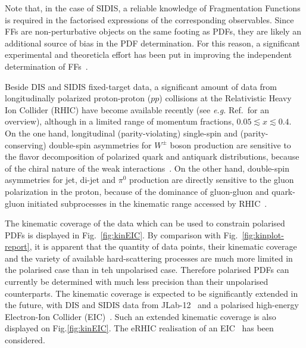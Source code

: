 Note that, in the case of SIDIS, a reliable knowledge of 
Fragmentation Functions is required in the factorised expressions of the 
corresponding observables. 
%
Since FFs are non-perturbative objects on the 
same footing as PDFs, they are likely an additional source of 
bias in the PDF determination.
%
For this reason, a significant experimental and theoreticla effort has been
put in improving the independent determination of 
FFs~\cite{deFlorian:2014xna,deFlorian:2017lwf,
Hirai:2016loo,Sato:2016tuz,Nocera:2017qgb,Bertone:2017xsf}.

Beside DIS and SIDIS fixed-target data, a significant amount of data from
longitudinally polarized proton-proton ($pp$) collisions at the Relativistic 
Heavy Ion Collider (RHIC) have become available recently (see {\it e.g.} 
Ref.~\cite{Aschenauer:2015eha}for an overview), although in a limited range 
of momentum fractions, $0.05\lesssim x \lesssim 0.4$.
%
On the one hand, longitudinal (parity-violating) single-spin and 
(parity-conserving) double-spin asymmetries for $W^\pm$ boson production are 
sensitive to the flavor decomposition of polarized quark and antiquark 
distributions, because of the chiral nature of the weak 
interactions~\cite{Bourrely:1993dd}. 
%
On the other hand, double-spin asymmetries for jet, di-jet and $\pi^0$ 
production are directly sensitive to the gluon polarization in 
the proton, because of the dominance of gluon-gluon and quark-gluon initiated 
subprocesses in the kinematic range accessed by RHIC~\cite{Bourrely:1990pz}.

The kinematic coverage of the data which can be used to constrain polarised 
PDFs is displayed in Fig.~\ref{fig:kinEIC}.
%
By comparison with Fig.~\ref{fig:kinplot-report}, it is apparent that the
quantity of data points, their kinematic coverage and the variety of 
available hard-scattering processes are much more limited in the polarised case
than in teh unpolarised case.
%
Therefore polarised PDFs can currently be determined with much less 
precision than their unpolarised counterparts.
%
The kinematic coverage is expected to be significantly extended in the future,
with DIS and SIDIS data from JLab-12~\cite{Dudek:2012vr} and a polarised 
high-energy Electron-Ion Collider (EIC)~\cite{Accardi:2012qut}.
%
Such an extended kinematic coverage is also displayed on Fig.\ref{fig:kinEIC}.
%
The eRHIC realisation of an EIC~\cite{Aschenauer:2014cki} has been considered.

